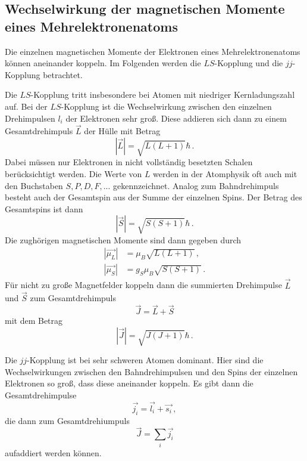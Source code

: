 \subsection{Wechselwirkung der magnetischen Momente eines Mehrelektronenatoms}

Die einzelnen magnetischen Momente der Elektronen eines Mehrelektronenatoms können aneinander
koppeln. Im Folgenden werden die $LS$-Kopplung und die $jj$-Kopplung betrachtet.

Die $LS$-Kopplung tritt insbesondere bei Atomen mit niedriger Kernladungszahl auf.
Bei der $LS$-Kopplung ist die Wechselwirkung zwischen den einzelnen Drehimpulsen
$l_i$ der Elektronen sehr groß. Diese addieren sich dann zu einem Gesamtdrehimpuls
$\vec{L}$ der Hülle mit Betrag
\begin{equation}
  |\vec{L}| = \sqrt{L(L+1)} \hbar \,.
\end{equation}
Dabei müssen nur Elektronen in nicht vollständig besetzten Schalen berücksichtigt werden.
Die Werte von $L$ werden in der Atomphysik oft auch mit den Buchstaben $S,P,D,F,...$ gekennzeichnet.
Analog zum Bahndrehimpuls besteht auch der Gesamtspin aus der Summe der einzelnen Spins.
Der Betrag des Gesamtspins ist dann
\begin{equation}
  |\vec{S}| = \sqrt{S(S+1)} \hbar \,.
\end{equation}
Die zughörigen magnetischen Momente sind dann gegeben durch
\begin{align}
  |\vec{\mu_L}| &= \mu_B \sqrt{L(L+1)} \,,\\
  |\vec{\mu_S}| &= g_S \mu_B \sqrt{S(S+1)} \,.
\end{align}
Für nicht zu große Magnetfelder koppeln dann die summierten Drehimpulse $\vec{L}$ und
$\vec{S}$ zum Gesamtdrehimpuls
\begin{equation}
  \vec{J}= \vec{L}+\vec{S}
\end{equation}
mit dem Betrag
\begin{equation}
  |\vec{J}| = \sqrt{J(J+1)}\hbar \,.
\end{equation}

Die $jj$-Kopplung ist bei sehr schweren Atomen dominant. Hier sind die Wechselwirkungen
zwischen den Bahndrehimpulsen und den Spins der einzelnen Elektronen so groß, dass diese
aneinander koppeln. Es gibt dann die Gesamtdrehimpulse
\begin{equation}
  \vec{j_i}=\vec{l_i}+\vec{s_i} \,,
\end{equation}
die dann zum Gesamtdrehiumpuls
\begin{equation}
  \vec{J}= \sum_i \vec{j_i}
\end{equation}
aufaddiert werden können.

